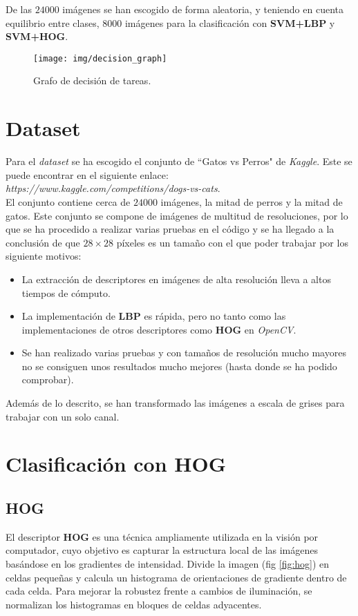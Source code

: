 \documentclass[12pt,letterpaper]{article}
\begin{document}
De las $24000$ imágenes se han escogido de forma aleatoria, y teniendo en cuenta equilibrio entre clases, $8000$ imágenes para la clasificación con \textbf{SVM+LBP} y \textbf{SVM+HOG}.

\begin{figure}[htp]
    \centering
    \texttt{[image: img/decision\_graph]}
    \caption{Grafo de decisión de tareas.}
    \label{fig:de_graph}
\end{figure}

\section{Dataset}
Para el \textit{dataset} se ha escogido el conjunto de ``Gatos vs Perros" de \textit{Kaggle}. Este se puede encontrar en el siguiente enlace: \textit{https://www.kaggle.com/competitions/dogs-vs-cats}.\\[6pt]
El conjunto contiene cerca de $24000$ imágenes, la mitad de perros y la mitad de gatos. Este conjunto se compone de imágenes de multitud de resoluciones, por lo que se ha procedido a realizar varias pruebas en el código y se ha llegado a la conclusión de que $28\times 28$ píxeles es un tamaño con el que poder trabajar por los siguiente motivos:
\begin{itemize}
    \item La extracción de descriptores en imágenes de alta resolución lleva a altos tiempos de cómputo.
    \item La implementación de \textbf{LBP} es rápida, pero no tanto como las implementaciones de otros descriptores como \textbf{HOG} en \textit{OpenCV}.
    \item Se han realizado varias pruebas y con tamaños de resolución mucho mayores no se consiguen unos resultados mucho mejores (hasta donde se ha podido comprobar).
\end{itemize}
Además de lo descrito, se han transformado las imágenes a escala de grises para trabajar con un solo canal. 

\section{Clasificación con HOG}
\subsection{HOG}
El descriptor \textbf{HOG} es una técnica ampliamente utilizada en la visión por computador, cuyo objetivo es capturar la estructura local de las imágenes basándose en los gradientes de intensidad. Divide la imagen (fig \ref{fig:hog}) en celdas pequeñas y calcula un histograma de orientaciones de gradiente dentro de cada celda. Para mejorar la robustez frente a cambios de iluminación, se normalizan los histogramas en bloques de celdas adyacentes.
\end{document}
